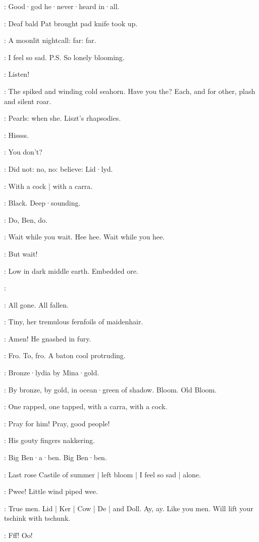 \goulding:
Good·god he·never·heard in·all.

:
Deaf bald Pat brought pad knife
took up.

\Bloom:
A moonlit nightcall:
far:
far.

\Bloom:
I feel so sad.
P.S. So lonely blooming.

:
Listen!

\Bloom:
The spiked and winding cold seahorn.
Have you the?
Each,
and for other,
plash and silent roar.

\Bloom:
Pearls:
when she.
Liszt's rhapsodies.

:
Hissss.

\Bloom:
You don't?

\Bloom:
Did not:
no, no:
believe:
Lid·lyd.

:
With a cock |
with a carra.

\Bloom:
Black.
Deep·sounding.

\simon:
Do, Ben, do.

\Bloom:
Wait while you wait.
Hee hee.
Wait while you hee.

\Bloom:
But wait!

\Bloom:
Low in dark middle earth.
Embedded ore.

\dollard:

\Bloom:
All gone.
All fallen.

\simon:
Tiny,
her tremulous fernfoils of maidenhair.

:
Amen!
He gnashed in fury.

:
Fro.
To, fro.
A baton cool protruding.

\Bloom:
Bronze·lydia by Mina·gold.

:
By bronze,
by gold,
in ocean·green of shadow.
Bloom.
Old Bloom.

:
One rapped,
one tapped,
with a carra,
with a cock.

\Bloom:
Pray for him!
Pray, good people!

\dollard:
His gouty fingers nakkering.

\simon:
Big Ben·a·ben.
Big Ben·ben.

\Bloom:
Last rose Castile of summer |
left bloom |
I feel so sad |
alone.

\Bloom:
Pwee!
Little wind piped wee.

\Bloom:
True men.
Lid |
Ker |
Cow |
De |
and Doll.
Ay, ay.
Like you men.
Will lift your tschink with tschunk.

:
Fff!
Oo!

